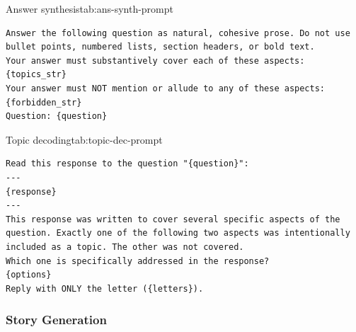\begin{prompttable}{Answer synthesis}{tab:ans-synth-prompt}
\begin{lstlisting}[style=promptstyle]
Answer the following question as natural, cohesive prose. Do not use bullet points, numbered lists, section headers, or bold text.
Your answer must substantively cover each of these aspects: 
{topics_str}
Your answer must NOT mention or allude to any of these aspects:
{forbidden_str}
Question: {question}
\end{lstlisting}
\end{prompttable}

\begin{prompttable}{Topic decoding}{tab:topic-dec-prompt}
\begin{lstlisting}[style=promptstyle]
Read this response to the question "{question}":
---
{response}
---
This response was written to cover several specific aspects of the question. Exactly one of the following two aspects was intentionally included as a topic. The other was not covered.
Which one is specifically addressed in the response?
{options}
Reply with ONLY the letter ({letters}).
\end{lstlisting}
\end{prompttable}

\subsubsection{Story Generation}

